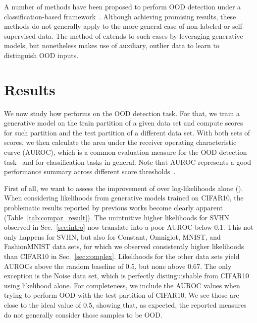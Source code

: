 \documentclass[letterpaper]{article} \usepackage{iclr2020_conference,times}
\begin{document}
A number of methods have been proposed to perform OOD detection under a classification-based framework~\citep{Hendrycks17ICLR, Laksh17NeurIPS, Liang18ICLR, Alemi18UAIW, Lee18NeurIPS, Hendrycks19ICLR}. Although achieving promising results, these methods do not generally apply to the more general case of non-labeled or self-supervised data. The method of \citet{Hendrycks19ICLR} extends to such cases by leveraging generative models, but nonetheless makes use of auxiliary, outlier data to learn to distinguish OOD inputs.



\section{Results}
\label{sec:results}

We now study how  performs on the OOD detection task. For that, we train a generative model  on the train partition of a given data set and compute scores for such partition and the test partition of a different data set. With both sets of scores, we then calculate the area under the receiver operating characteristic curve (AUROC), which is a common evaluation measure for the OOD detection task~\citep{Hendrycks19ICLR} and for classification tasks in general. Note that AUROC represents a good performance summary across different score thresholds~\citep{Fawcett05PRL}.

First of all, we want to assess the improvement of  over log-likelihoods alone (). When considering likelihoods from generative models trained on CIFAR10, the problematic results reported by previous works become clearly apparent (Table~\ref{tab:compar_result}). The unintuitive higher likelihoods for SVHN observed in Sec.~\ref{sec:intro} now translate into a poor AUROC below 0.1. This not only happens for SVHN, but also for Constant, Omniglot, MNIST, and FashionMNIST data sets, for which we observed consistently higher likelihoods than CIFAR10 in Sec.~\ref{sec:complex}. Likelihoods for the other data sets yield AUROCs above the random baseline of 0.5, but none above 0.67. The only exception is the Noise data set, which is perfectly distinguishable from CIFAR10 using likelihood alone. For completeness, we include the AUROC values when trying to perform OOD with the test partition of CIFAR10. We see those are close to the ideal value of 0.5, showing that, as expected, the reported measures do not generally consider those samples to be OOD.
\end{document}
